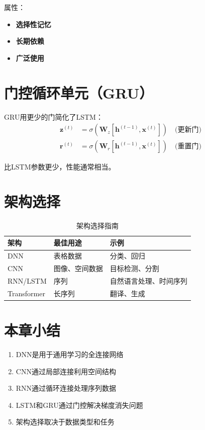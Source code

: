 属性：
\begin{itemize}
    \item \textbf{选择性记忆}
    \item \textbf{长期依赖}
    \item \textbf{广泛使用}
\end{itemize}

\section{门控循环单元（GRU）}

GRU用更少的门简化了LSTM：
\begin{align}
\mathbf{z}^{(t)} &= \sigma(\mathbf{W}_z[\mathbf{h}^{(t-1)}, \mathbf{x}^{(t)}]) \quad \text{(更新门)} \\
\mathbf{r}^{(t)} &= \sigma(\mathbf{W}_r[\mathbf{h}^{(t-1)}, \mathbf{x}^{(t)}]) \quad \text{(重置门)}
\end{align}

比LSTM参数更少，性能通常相当。

\section{架构选择}

\begin{table}[h]
    \centering
    \caption{架构选择指南}
    \begin{tabular}{L{2.5cm} L{3.5cm} L{4cm}}
        \toprule
        \textbf{架构} & \textbf{最佳用途} & \textbf{示例} \\
        \midrule
        DNN & 表格数据 & 分类、回归 \\
        CNN & 图像、空间数据 & 目标检测、分割 \\
        RNN/LSTM & 序列 & 自然语言处理、时间序列 \\
        Transformer & 长序列 & 翻译、生成 \\
        \bottomrule
    \end{tabular}
\end{table}

\section{本章小结}

\begin{enumerate}
    \item DNN是用于通用学习的全连接网络
    \item CNN通过局部连接利用空间结构
    \item RNN通过循环连接处理序列数据
    \item LSTM和GRU通过门控解决梯度消失问题
    \item 架构选择取决于数据类型和任务
\end{enumerate}
